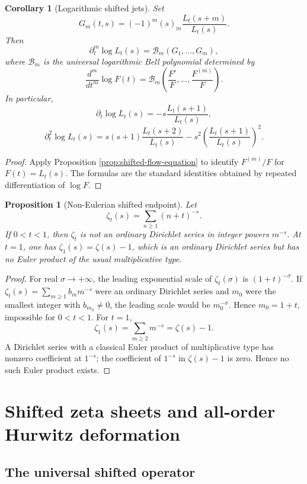 \documentclass[11pt]{article}
\theoremstyle{plain}
\newtheorem{proposition}[theorem]{Proposition}
\newtheorem{corollary}[theorem]{Corollary}
\theoremstyle{definition}
\begin{document}
\begin{corollary}[Logarithmic shifted jets]\label{cor:log-shifted-jets}
Set
\[
   G_m(t,s)=(-1)^m(s)_m\frac{L_t(s+m)}{L_t(s)}.
\]
Then
\[
   \partial_t^m\log L_t(s)=\mathcal B_m(G_1,\ldots,G_m),
\]
where \(\mathcal B_m\) is the universal logarithmic Bell polynomial determined by
\[
   \frac{d^m}{dt^m}\log F(t)=\mathcal B_m\left(\frac{F'}F,\ldots,\frac{F^{(m)}}F\right).
\]
In particular,
\[
   \partial_t\log L_t(s)=-s\frac{L_t(s+1)}{L_t(s)},
\]
\[
   \partial_t^2\log L_t(s)=s(s+1)\frac{L_t(s+2)}{L_t(s)}-s^2\left(\frac{L_t(s+1)}{L_t(s)}\right)^2.
\]
\end{corollary}

\begin{proof}
Apply Proposition \ref{prop:shifted-flow-equation} to identify \(F^{(m)}/F\) for \(F(t)=L_t(s)\).  The formulas are the standard identities obtained by repeated differentiation of \(\log F\).
\end{proof}

\begin{proposition}[Non-Eulerian shifted endpoint]\label{prop:non-eulerian-shifted-endpoint}
Let
\[
   \zeta_t(s)=\sum_{n\ge1}(n+t)^{-s}.
\]
If \(0<t<1\), then \(\zeta_t\) is not an ordinary Dirichlet series in integer powers \(m^{-s}\).  At \(t=1\), one has \(\zeta_1(s)=\zeta(s)-1\), which is an ordinary Dirichlet series but has no Euler product of the usual multiplicative type.
\end{proposition}

\begin{proof}
For real \(\sigma\to+\infty\), the leading exponential scale of \(\zeta_t(\sigma)\) is \((1+t)^{-\sigma}\).  If \(\zeta_t(s)=\sum_{m\ge1}b_m m^{-s}\) were an ordinary Dirichlet series and \(m_0\) were the smallest integer with \(b_{m_0}\ne0\), the leading scale would be \(m_0^{-\sigma}\).  Hence \(m_0=1+t\), impossible for \(0<t<1\).  For \(t=1\),
\[
   \zeta_1(s)=\sum_{m\ge2}m^{-s}=\zeta(s)-1.
\]
A Dirichlet series with a classical Euler product of multiplicative type has nonzero coefficient at \(1^{-s}\); the coefficient of \(1^{-s}\) in \(\zeta(s)-1\) is zero.  Hence no such Euler product exists.
\end{proof}

\section{Shifted zeta sheets and all-order Hurwitz deformation}

\subsection{The universal shifted operator}
\end{document}
